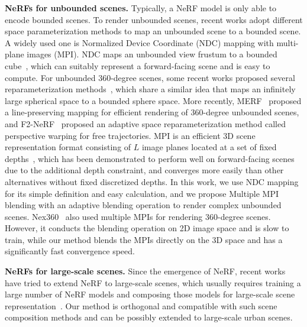 \documentclass[letterpaper, 10 pt, conference]{ieeeconf}  %
\begin{document}
\noindent
{\bf NeRFs for unbounded scenes.} Typically, a NeRF model is only able to encode bounded scenes.
To render unbounded scenes, recent works adopt different space parameterization methods to map an unbounded scene to a bounded scene.
A widely used one is Normalized Device Coordinate (NDC) mapping with multi-plane images (MPI). NDC maps an unbounded view frustum to a bounded cube~\cite{mildenhall2020nerf, yu2021plenoxels, chen2022tensorf, sun2021direct}, which can suitably represent a forward-facing scene and is easy to compute.
For unbounded 360-degree scenes, some recent works proposed several reparameterization methods~\cite{barron2022mip, yu2021plenoxels, zhang2020nerf++, neff2021donerf}, which share a similar idea that maps an infinitely large spherical space to a bounded sphere space.
More recently, MERF~\cite{reiser2023merf} proposed a line-preserving mapping for efficient rendering of 360-degree unbounded scenes, and F2-NeRF~\cite{wang2023f} proposed an adaptive space reparameterization method called perspective warping for free trajectories.
MPI is an efficient 3D scene representation format consisting of $L$ image planes located at a set of fixed depths~\cite{zhou2018stereo,SrinivasanTBRNS19,mildenhall2019llff,flynn2019deepview,LiHHHW21,LiHJHHW21}, which has been demonstrated to perform well on forward-facing scenes due to the additional depth constraint, and converges more easily than other alternatives without fixed discretized depths.
In this work, we use NDC mapping for its simple definition and easy calculation, and we propose Multiple MPI blending with an adaptive blending operation to render complex unbounded scenes. 
Nex360~\cite{phongthawee2022nex360} also used multiple MPIs for rendering 360-degree scenes. However, it  
conducts the blending operation on 2D image space and is slow to train, while our method blends the MPIs directly on the 3D space and has a significantly fast convergence speed.

\noindent
{\bf NeRFs for large-scale scenes.}
Since the emergence of NeRF, recent works have tried to extend NeRF to large-scale scenes, which usually requires training a large number of NeRF models and composing those models for large-scale scene representation~\cite{tancik2022block, rematas2022urban, turki2022mega, xiangli2022bungeenerf}.
Our method is orthogonal and compatible with such scene composition methods and can be possibly extended to large-scale urban scenes.
\end{document}
